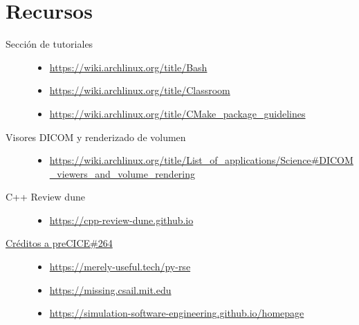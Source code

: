 \documentclass[9pt,a3paper]{scrartcl}
\begin{document}
\section*{\Huge Recursos}

\begin{description}
	\item[Sección de tutoriales]
		\leavevmode

		\begin{itemize}
			\item

			      \url{https://wiki.archlinux.org/title/Bash}

			\item

			      \url{https://wiki.archlinux.org/title/Classroom}

			\item

			      \url{https://wiki.archlinux.org/title/CMake_package_guidelines}
		\end{itemize}


	\item[Visores DICOM y renderizado de volumen]
		\leavevmode
		\begin{itemize}
			\item

			      \url{https://wiki.archlinux.org/title/List_of_applications/Science#DICOM_viewers_and_volume_rendering}
		\end{itemize}

	\item[C++ Review dune]
		\leavevmode
		\begin{itemize}
			\item

			      \url{https://cpp-review-dune.github.io}
		\end{itemize}


	\item[\href{https://github.com/precice/tutorials/pull/264/files}{Créditos a preCICE\#264}]
		\leavevmode
		\begin{itemize}
			\item

			      \url{https://merely-useful.tech/py-rse}

			\item

			      \url{https://missing.csail.mit.edu}

			\item

			      \url{https://simulation-software-engineering.github.io/homepage}
		\end{itemize}

\end{description}
\end{document}
